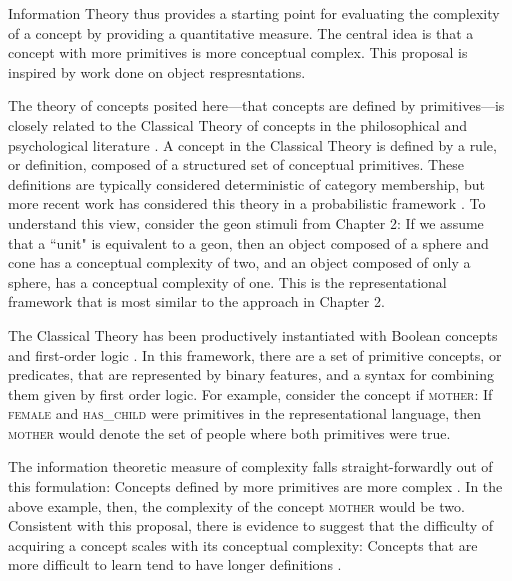 Information Theory thus provides a  starting point for evaluating the complexity of a concept by providing a quantitative measure.
The central idea is that a concept with more primitives is more conceptual complex. This proposal is inspired by work done on object respresntations.%

The theory of concepts posited here---that concepts are defined by primitives---is closely related to the Classical Theory of concepts in the philosophical and psychological literature  \cite{laurence1999concepts}.   A concept in the Classical Theory is defined by a rule, or definition, composed of a structured set of conceptual primitives. These definitions are typically considered deterministic of category membership, but more recent work has considered this theory in a probabilistic framework \cite{goodman2008rational}. To understand this view, consider the geon stimuli from Chapter 2:  If we assume that a ``unit" is equivalent to a geon,  then an object composed of a sphere and cone has a conceptual complexity of two, and an object composed of only a sphere, has a conceptual complexity of one. This is the representational framework that is most similar to the approach in Chapter 2.

The Classical Theory has been productively instantiated with Boolean concepts and first-order logic \cite{shepard1961learning,feldman2000minimization,goodman2008rational}.  In this  framework, there are a set of primitive concepts, or predicates, that are represented by binary features, and a syntax for combining them given by first order logic.  For example, consider the concept if \textsc{mother}: If \textsc{female} and \textsc{has\_child} were primitives in the representational language, then  \textsc{mother} would denote the set of people where both primitives were true. 

The information theoretic measure of complexity falls straight-forwardly out of this formulation: Concepts defined by more primitives are more complex \cite{shepard1961learning,feldman2000minimization,goodman2008rational}. In the  above example, then, the complexity of the concept  \textsc{mother} would be two. Consistent with this proposal, there is evidence to suggest that the difficulty of acquiring a concept scales with its conceptual complexity: Concepts that are more difficult to learn tend to have longer definitions \cite{shepard1961learning,feldman2000minimization}.


